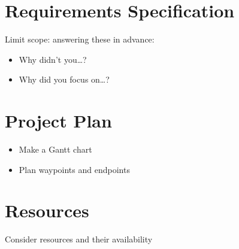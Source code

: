 \documentclass[a4paper,11pt]{article}
\begin{document}
\section{Requirements Specification} %
Limit scope: answering these in advance:
\begin{itemize}
  \item Why didn't you\dots?
  \item Why did you focus on\dots?
\end{itemize}

\section{Project Plan} %
\begin{itemize}
  \item Make a Gantt chart
  \item Plan waypoints and endpoints
\end{itemize}

\section{Resources}
Consider resources and their availability
\end{document}
